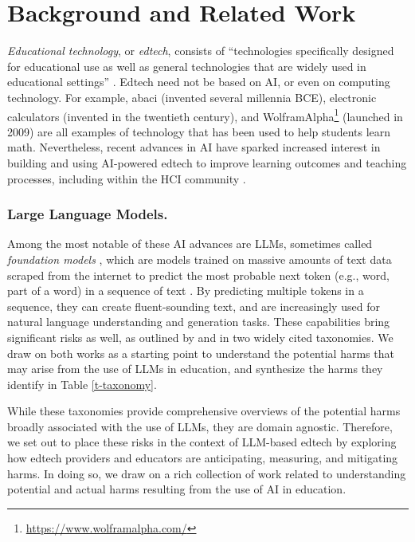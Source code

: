 \section{Background and Related Work}\label{s-background}
\textit{Educational technology}, or \textit{edtech}, consists of ``technologies specifically designed for educational use as well as general technologies that are widely used in educational settings'' \cite{cardona_artificial_2023}. Edtech need not be based on AI, or even on computing technology. For example, abaci (invented several millennia BCE), electronic calculators (invented in the twentieth century), and WolframAlpha\footnote{\url{https://www.wolframalpha.com/}} (launched in 2009) are all examples of technology that has been used to help students learn math. Nevertheless, recent advances in AI have sparked increased interest in building and using AI-powered edtech to improve learning outcomes and teaching processes, including within the HCI community \citep[e.g.,][]{zhang_mathemyths_2024, cheng_scientific_2024, leong_putting_2024, lee_dapie_2023, lu_readingquizmaker_2023}.

\subsubsection*{Large Language Models.}\label{s-prior_taxonomy}
Among the most notable of these AI advances are LLMs, sometimes called \textit{foundation models} \cite{bommasani2022opportunities}, which are models trained on massive amounts of text data scraped from the internet to predict the most probable next token (e.g., word, part of a word) in a sequence of text \cite{radford_improving_2018}. By predicting multiple tokens in a sequence, they can create fluent-sounding text, and are increasingly used for natural language understanding and generation tasks. These capabilities bring significant risks as well, as outlined by \citet{bender_dangers_2021} and \citet{weidinger_taxonomy_2022} in two widely cited taxonomies. We draw on both works as a starting point to understand the potential harms that may arise from the use of LLMs in education, and synthesize the harms they identify in Table \ref{t-taxonomy}.



While these taxonomies provide comprehensive overviews of the potential harms broadly associated with the use of LLMs, they are domain agnostic. Therefore, we set out to place these risks in the context of LLM-based edtech by exploring how edtech providers and educators are anticipating, measuring, and mitigating harms. In doing so, we draw on a rich collection of work related to understanding potential and actual harms resulting from the use of AI in education.

